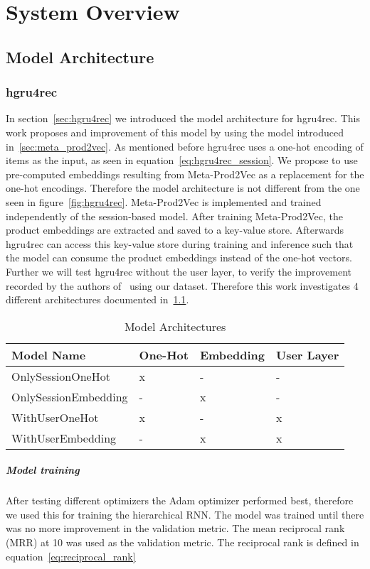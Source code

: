 \chapter{System Overview}

\section{Model Architecture}\label{sec:model_arch}
\subsection{hgru4rec}
In section~\ref{sec:hgru4rec} we introduced the model architecture for hgru4rec.
This work proposes and improvement of this model by using the model introduced in~\ref{sec:meta_prod2vec}.
As mentioned before hgru4rec uses a one-hot encoding of items as the input, as seen in equation~\ref{eq:hgru4rec_session}.
We propose to use pre-computed embeddings resulting from Meta-Prod2Vec as a replacement for the one-hot encodings.
Therefore the model architecture is not different from the one seen in figure~\ref{fig:hgru4rec}.
Meta-Prod2Vec is implemented and trained independently of the session-based model.
After training Meta-Prod2Vec, the product embeddings are extracted and saved to a key-value store.
Afterwards hgru4rec can access this key-value store during training and inference such that the model can consume the product embeddings instead of the one-hot vectors.
Further we will test hgru4rec without the user layer, to verify the improvement recorded by the authors of~\cite{hierarchical} using our dataset.
Therefore this work investigates 4 different architectures documented in~\ref{tab:model_archs}.
\begin{table}[t]
    \centering
    \begin{tabular}{llll}\toprule
        \textbf{Model Name} & \textbf{One-Hot} & \textbf{Embedding} & \textbf{User Layer} \\ \midrule
        OnlySessionOneHot & x & - & - \\
        OnlySessionEmbedding & - & x & - \\
        WithUserOneHot & x & - & x \\
        WithUserEmbedding & - & x & x \\ \bottomrule
    \end{tabular}
    \caption{Model Architectures}
    \label{tab:model_archs}
\end{table}
\paragraph{Model training}
After testing different optimizers the Adam optimizer performed best, therefore we used this for training the hierarchical RNN.
The model was trained until there was no more improvement in the validation metric.
The mean reciprocal rank (MRR) at 10 was used as the validation metric.
The reciprocal rank is defined in equation~\ref{eq:reciprocal_rank}

